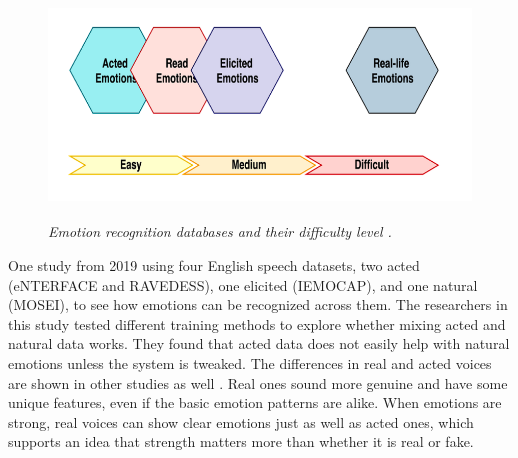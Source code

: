 \begin{figure}[ht]
    \centering
    \includegraphics[height=6cm]{png/databases difficulty.png}
    \caption{\textit{Emotion recognition databases and their difficulty level \autocite{Khalil2019}.}}
    \label{fig:databases-diff}
\end{figure}
One study from 2019 \autocite{Milner2019} using four English speech datasets, two acted (eNTERFACE and RAVEDESS), one elicited (IEMOCAP), and one natural (MOSEI), to see how emotions can be recognized across them. The researchers in this study tested different training methods to explore whether mixing acted and natural data works. They found that acted data does not easily help with natural emotions unless the system is tweaked. The differences in real and acted voices are shown in other studies as well \autocite{Juslin2018}. Real ones sound more genuine and have some unique features, even if the basic emotion patterns are alike. When emotions are strong, real voices can show clear emotions just as well as acted ones, which supports an idea that strength matters more than whether it is real or fake.

